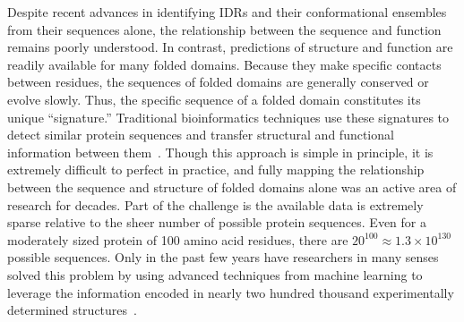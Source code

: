 Despite recent advances in identifying IDRs and their conformational ensembles from their sequences alone, the relationship between the sequence and function remains poorly understood. In contrast, predictions of structure and function are readily available for many folded domains. Because they make specific contacts between residues, the sequences of folded domains are generally conserved or evolve slowly. Thus, the specific sequence of a folded domain constitutes its unique ``signature.'' Traditional bioinformatics techniques use these signatures to detect similar protein sequences and transfer structural and functional information between them~\cite{Camacho2009, Eddy2009, Mistry2020}. Though this approach is simple in principle, it is extremely difficult to perfect in practice, and fully mapping the relationship between the sequence and structure of folded domains alone was an active area of research for decades. Part of the challenge is the available data is extremely sparse relative to the sheer number of possible protein sequences. Even for a moderately sized protein of 100 amino acid residues, there are $20^{100} \approx 1.3 \times 10^{130}$ possible sequences. Only in the past few years have researchers in many senses solved this problem by using advanced techniques from machine learning to leverage the information encoded in nearly two hundred thousand experimentally determined structures~\cite{Jumper2021}.


